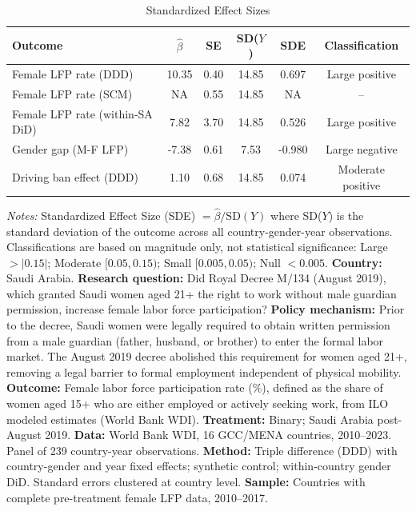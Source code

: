 \begin{table}[htbp]
\centering
\caption{Standardized Effect Sizes}
\label{tab:sde}
\begin{tabular}{lccccc}
\hline\hline
Outcome & $\hat{\beta}$ & SE & SD($Y$) & SDE & Classification \\
\hline
Female LFP rate (DDD) & 10.35 & 0.40 & 14.85 & 0.697 & Large positive \\
Female LFP rate (SCM) & NA & 0.55 & 14.85 & NA & -- \\
Female LFP rate (within-SA DiD) & 7.82 & 3.70 & 14.85 & 0.526 & Large positive \\
Gender gap (M-F LFP) & -7.38 & 0.61 & 7.53 & -0.980 & Large negative \\
Driving ban effect (DDD) & 1.10 & 0.68 & 14.85 & 0.074 & Moderate positive \\
\hline\hline
\end{tabular}
\begin{minipage}{0.95\textwidth}
{\footnotesize \textit{Notes:} Standardized Effect Size (SDE) $= \hat{\beta} / \text{SD}(Y)$ where SD($Y$) is the standard deviation of the outcome across all country-gender-year observations. Classifications are based on magnitude only, not statistical significance: Large $> |0.15|$; Moderate $[0.05, 0.15)$; Small $[0.005, 0.05)$; Null $< 0.005$. \textbf{Country:} Saudi Arabia. \textbf{Research question:} Did Royal Decree M/134 (August 2019), which granted Saudi women aged 21+ the right to work without male guardian permission, increase female labor force participation? \textbf{Policy mechanism:} Prior to the decree, Saudi women were legally required to obtain written permission from a male guardian (father, husband, or brother) to enter the formal labor market. The August 2019 decree abolished this requirement for women aged 21+, removing a legal barrier to formal employment independent of physical mobility. \textbf{Outcome:} Female labor force participation rate (\%), defined as the share of women aged 15+ who are either employed or actively seeking work, from ILO modeled estimates (World Bank WDI). \textbf{Treatment:} Binary; Saudi Arabia post-August 2019. \textbf{Data:} World Bank WDI, 16 GCC/MENA countries, 2010--2023. Panel of 239 country-year observations. \textbf{Method:} Triple difference (DDD) with country-gender and year fixed effects; synthetic control; within-country gender DiD. Standard errors clustered at country level. \textbf{Sample:} Countries with complete pre-treatment female LFP data, 2010--2017.}
\end{minipage}
\end{table}
